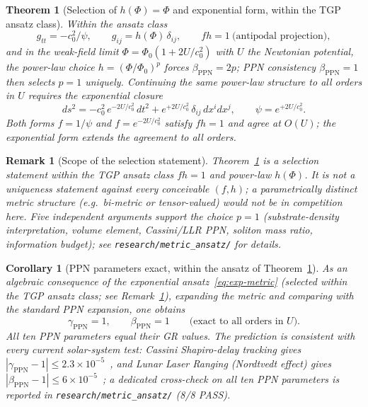 \documentclass[11pt,a4paper]{article}
\renewcommand{\Phi}{\varPhi}
\newcommand{\PhiZero}{\varPhi_{0}}
\newtheorem{theorem}[axiom]{Theorem}
\newtheorem{corollary}[axiom]{Corollary}
\newtheorem{remark}[axiom]{Remark}
\begin{document}
\begin{theorem}[Selection of $h(\Phi)=\Phi$ and exponential form,
within the TGP ansatz class]\label{thm:metric}
Within the ansatz class
\begin{equation}
  g_{tt}=-c_{0}^{2}/\psi,\qquad g_{ij}=h(\Phi)\,\delta_{ij},
  \qquad fh=1\ \text{(antipodal projection)},
\end{equation}
and in the weak-field limit $\Phi=\PhiZero(1+2U/c_{0}^{2})$ with $U$ the
Newtonian potential, the power-law choice $h=(\Phi/\PhiZero)^{p}$ forces
$\beta_{\mathrm{PPN}}=2p$; PPN consistency $\beta_{\mathrm{PPN}}=1$ then
selects $p=1$ uniquely. Continuing the same power-law structure to
\emph{all} orders in $U$ requires the exponential closure
\begin{equation}\label{eq:exp-metric}
  \boxed{\;
    ds^{2}
    =-c_{0}^{2}\,e^{-2U/c_{0}^{2}}\,dt^{2}
    +e^{+2U/c_{0}^{2}}\,\delta_{ij}\,dx^{i}dx^{j},
    \qquad
    \psi=e^{+2U/c_{0}^{2}}.
  \;}
\end{equation}
Both forms $f=1/\psi$ and $f=e^{-2U/c_{0}^{2}}$ satisfy $fh=1$ and agree
at $O(U)$; the exponential form extends the agreement to all orders.
\end{theorem}

\begin{remark}[Scope of the selection statement]\label{rem:metric-scope}
Theorem~\ref{thm:metric} is a selection statement \emph{within} the TGP
ansatz class $fh=1$ and power-law $h(\Phi)$. It is not a uniqueness
statement against every conceivable $(f,h)$; a parametrically distinct
metric structure (e.g.\ bi-metric or tensor-valued) would not be in
competition here. Five independent arguments support the choice $p=1$
(substrate-density interpretation, volume element, Cassini/LLR PPN,
soliton mass ratio, information budget); see
\texttt{research/metric\_ansatz/} for details.
\end{remark}

\begin{corollary}[PPN parameters exact, within the ansatz of Theorem~\ref{thm:metric}]\label{cor:ppn}
As an algebraic consequence of the exponential ansatz~\eqref{eq:exp-metric}
(selected within the TGP ansatz class; see
Remark~\ref{rem:metric-scope}), expanding the metric and comparing with
the standard PPN expansion, one obtains
\begin{equation}\label{eq:ppn}
  \gamma_{\mathrm{PPN}}=1,\qquad \beta_{\mathrm{PPN}}=1
  \qquad\text{(exact to all orders in $U$).}
\end{equation}
All ten PPN parameters equal their GR values. The prediction is
consistent with every current solar-system test:
Cassini Shapiro-delay tracking gives
$|\gamma_{\mathrm{PPN}}-1|\leq 2.3\times 10^{-5}$~\cite{BertottiCassini},
and Lunar Laser Ranging (Nordtvedt effect) gives
$|\beta_{\mathrm{PPN}}-1|\leq 6\times 10^{-5}$~\cite{WilliamsLLR};
a dedicated cross-check on all ten PPN parameters is reported in
\texttt{research/metric\_ansatz/} (8/8 PASS).
\end{corollary}
\end{document}
